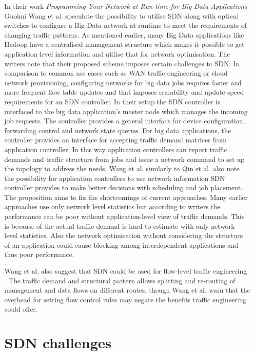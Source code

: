 \documentclass{acm_proc_article-sp}
\begin{document}
In their work \textit{Programming Your Network at Run-time for Big Data Applications} \cite{Wang:2012:PYN:2342441.2342462} Guohui Wang et al. speculate the possibility to utilise SDN along with optical switches to configure a Big Data network at runtime to meet the requirements of changing traffic patterns. As mentioned earlier, many Big Data applications like Hadoop have a centralised management structure which makes it possible to get application-level information and utilise that for network optimisation. The writers note that their proposed scheme imposes certain challenges to SDN: In comparison to common use cases such as WAN traffic engineering or cloud network provisioning, configuring networks for big data jobs requires faster and more frequent flow table updates and that imposes scalability and update speed requirements for an SDN controller. In their setup the SDN controller is interfaced to the big data application's master node which manages the incoming job requests. The controller provides a general interface for device configuration, forwarding control and network state queries. For big data applications, the controller provides an interface for accepting traffic demand matrices from application controller. In this way application controllers can report traffic demands and traffic structure from jobs and issue a network command to set up the topology to address the needs. Wang et al. similarly to Qin et al.\cite{Scheduling} also note the possibility for application controllers to use network information SDN controller provides to make better decisions  with scheduling and job placement. The proposition aims to fix the shortcomings of current approaches. Many earlier approaches use only network level statistics but according to writers the performance can be poor without application-level view of traffic demands. This is because of the actual traffic demand is hard to estimate with only network-level statistics. Also the network optimisation without considering the structure of an application could cause blocking among interdependent applications and thus poor performance. 

Wang et al. also suggest that SDN could be used for flow-level traffic engineering \cite{Wang:2012:PYN:2342441.2342462}. The traffic demand and structural pattern  allows splitting and re-routing of management and data flows on different routes, though Wang et al. warn that the overhead for setting flow control rules may negate the benefits traffic engineering could offer.

\section{SDN challenges}
\end{document}
